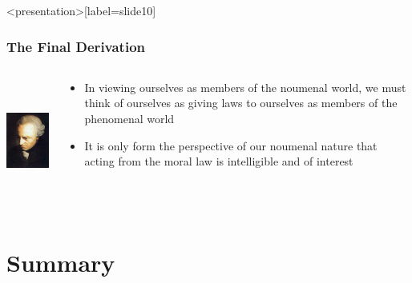 \begin{frame}<presentation>[label=slide10]
    \frametitle{The Final Derivation}
        \begin{columns}
            \begin{column}{3cm}
                \includegraphics[height=4cm]{../../graphics/kant.jpg}
            \end{column}
            \begin{column}{7cm}
                \begin{itemize}
                    \item In viewing ourselves as members of the noumenal world, we must think of ourselves as giving laws to ourselves as members of the phenomenal world
                    \item It is only form the perspective of our noumenal nature that acting from the moral law is intelligible and of interest
                \end{itemize}
            \end{column}
        \end{columns}
\end{frame}


\section*{Summary}


